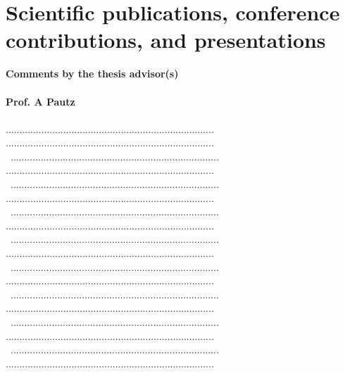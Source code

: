 \documentclass[11pt,titlepage]{article}
\begin{document}
\section{Scientific publications, conference contributions, and presentations}

\nocite{Wicaksono2014a}
\nocite{Wicaksono2014b}
\nocite{Wicaksono2014c}
\nocite{Wicaksono2014d}
\nocite{Wicaksono2014e}
\printbibliography[heading=none]

\newpage
\noindent\textbf{Comments by the thesis advisor(s)}\\\\
\noindent\textbf{Prof. A Pautz}\\\\
............................................................................
............................................................................\\\
............................................................................
............................................................................\\\
............................................................................
............................................................................\\\
............................................................................
............................................................................\\\
............................................................................
............................................................................\\\
............................................................................
............................................................................\\\
............................................................................
............................................................................\\\
............................................................................
............................................................................\\\
............................................................................
............................................................................\\\
\end{document}
